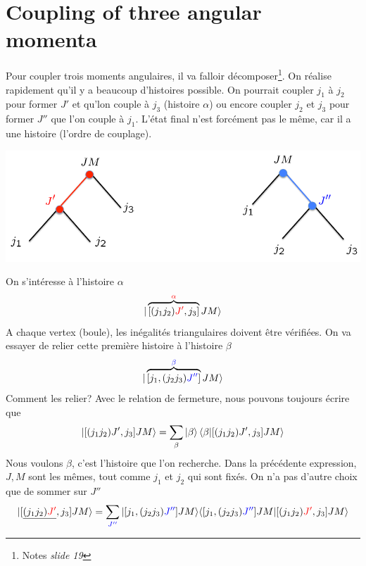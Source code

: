 \section{Coupling of three angular momenta}
Pour coupler trois moments angulaires, il va falloir décomposer\footnote{Notes \textit{slide 19}}. On
réalise rapidement qu'il y a beaucoup d'histoires possible. On pourrait coupler $j_1$ à $j_2$ pour
former $J'$ et qu'lon couple à $j_3$ (histoire $\alpha$) ou encore coupler $j_2$ et $j_3$ 
pour former $J''$ que l'on couple à $j_1$. L'état final n'est forcément pas le même, car il a une histoire (l'ordre de couplage). 
\begin{center}
\includegraphics[scale=0.45]{ch1/image4}
\end{center}
On s'intéresse à l'histoire $\alpha$
\begin{equation}
  \vert 
\overbrace{ [(j_1 j_2) {\color{red} J'}, j_3 ]}
^{ {\color{red} \alpha}} 
J M \rangle
\end{equation}
A chaque vertex (boule), les inégalités triangulaires doivent être vérifiées. On va essayer de
relier cette première histoire à l'histoire $\beta$
\begin{equation}
  \vert \overbrace{[ j_1, (j_2 j_3) {\color{blue} J''}] }
^{{\color{blue} \beta}}
J M \rangle
\end{equation}
Comment les relier? Avec le relation de fermeture, nous pouvons toujours écrire que
\begin{equation}
\ket{[(j_1j_2)J',j_3]JM} = \sum_\beta \ket\beta\bra\beta\ket{[(j_1j_2)J',j_3]JM}
\end{equation}
Nous voulons $\beta$, c'est l'histoire que l'on recherche.  Dans la précédente expression,
$J,M$ sont les mêmes, tout comme $j_1$ et $j_2$ qui sont fixés. On n'a pas d'autre choix que
de sommer sur $J''$
\begin{equation}
\vert 
 [\underline{(j_1 j_2) {\color{red} J'}}, j_3 ]J M \rangle= \sum_{ {\color{blue} J''}} 
\vert [ j_1, (j_2 j_3) {\color{blue} J''}]  
J M  \rangle
 \langle  [ j_1, (j_2 j_3) {\color{blue} J''}]  
J M \vert 
[(j_1 j_2) {\color{red} J'}, j_3 ]J M \rangle
\end{equation}
